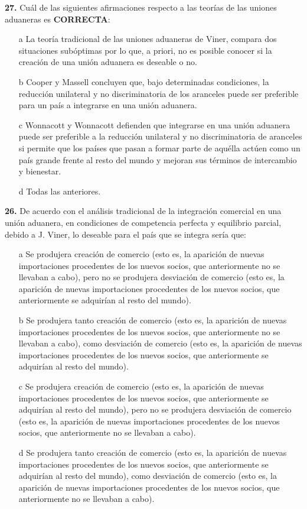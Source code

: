 \documentclass{nuevotema}
\begin{document}
\textbf{27.} Cuál de las siguientes afirmaciones respecto a las teorías de las uniones aduaneras es \textbf{CORRECTA}:

\begin{itemize}
	\item[a] La teoría tradicional de las uniones aduaneras de Viner, compara dos situaciones subóptimas por lo que, a priori, no es posible conocer si la creación de una unión aduanera es deseable o no.
	\item[b] Cooper y Massell concluyen que, bajo determinadas condiciones, la reducción unilateral y no discriminatoria de los aranceles puede ser preferible para un país a integrarse en una unión aduanera.
	\item[c] Wonnacott y Wonnacott defienden que integrarse en una unión aduanera puede ser preferible a la reducción unilateral y no discriminatoria de aranceles si permite que los países que pasan a formar parte de aquélla actúen como un país grande frente al resto del mundo y mejoran sus términos de intercambio y bienestar.
	\item[d] Todas las anteriores.
\end{itemize}

\textbf{26.} De acuerdo con el análisis tradicional de la integración comercial en una unión aduanera, en condiciones de competencia perfecta y equilibrio parcial, debido a J. Viner, lo deseable para el país que se integra sería que:

\begin{itemize}
	\item[a] Se produjera creación de comercio (esto es, la aparición de nuevas importaciones procedentes de los nuevos socios, que anteriormente no se llevaban a cabo), pero no se produjera desviación de comercio (esto es, la aparición de nuevas importaciones procedentes de los nuevos socios, que anteriormente se adquirían al resto del mundo).
	\item[b] Se produjera tanto creación de comercio (esto es, la aparición de nuevas importaciones procedentes de los nuevos socios, que anteriormente no se llevaban a cabo), como desviación de comercio (esto es, la aparición de nuevas importaciones procedentes de los nuevos socios, que anteriormente se adquirían al resto del mundo).
	\item[c] Se produjera creación de comercio (esto es, la aparición de nuevas importaciones procedentes de los nuevos socios, que anteriormente se adquirían al resto del mundo), pero no se produjera desviación de comercio (esto es, la aparición de nuevas importaciones procedentes de los nuevos socios, que anteriormente no se llevaban a cabo).
	\item[d] Se produjera tanto creación de comercio (esto es, la aparición de nuevas importaciones procedentes de los nuevos socios, que anteriormente se adquirían al resto del mundo), como desviación de comercio (esto es, la aparición de nuevas importaciones procedentes de los nuevos socios, que anteriormente no se llevaban a cabo).
\end{itemize}
\end{document}

